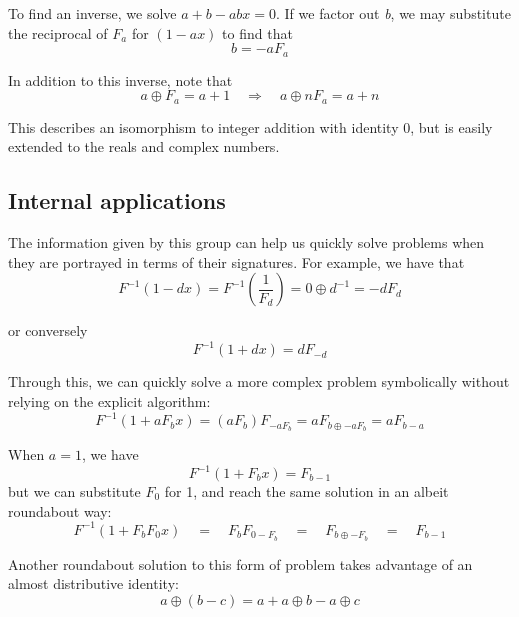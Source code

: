 \documentclass{article}
\begin{document}
\noindent To find an inverse, we solve $a + b - abx = 0$. If we factor out \textit{b}, we may substitute the reciprocal of $F_a$ for $(1-ax)$ to find that \begin{equation}b = -aF_a\end{equation}

\noindent In addition to this inverse, note that \begin{equation}a \oplus F_a = a + 1 \quad \Rightarrow \quad a \oplus nF_a = a + n\end{equation}

\noindent This describes an isomorphism to integer addition with identity 0, but is easily extended to the reals and complex numbers.

\subsection{Internal applications}

\noindent The information given by this group can help us quickly solve problems when they are portrayed in terms of their signatures. For example, we have that \begin{equation}F^{-1}(1-dx) = F^{-1}(\frac{1}{F_d}) = 0 \oplus d^{-1} = -dF_d\end{equation}

\noindent or conversely \begin{equation}F^{-1}(1 + dx) = dF_{-d}\end{equation}

\noindent Through this, we can quickly solve a more complex problem symbolically without relying on the explicit algorithm: \begin{equation}F^{-1}(1+aF_bx) = (aF_{b})F_{-aF_{b}} = aF_{b \oplus -aF_{b}} = aF_{b-a}\end{equation}

\noindent When $a = 1$, we have \begin{equation}F^{-1}(1+F_{b}x) = F_{b-1}\end{equation} but we can substitute $F_{0}$  for 1, and reach the same solution in an albeit roundabout way:\begin{equation}F^{-1}(1 + F_{b}F_{0}x) \quad = \quad F_{b}F_{0-F_{b}} \quad = \quad F_{b \oplus -F_{b}} \quad = \quad F_{b-1}\end{equation}

\noindent Another roundabout solution to this form of problem takes advantage of an almost distributive identity: \begin{equation}a \oplus (b-c) = a + a \oplus b - a \oplus c\end{equation}
\end{document}
